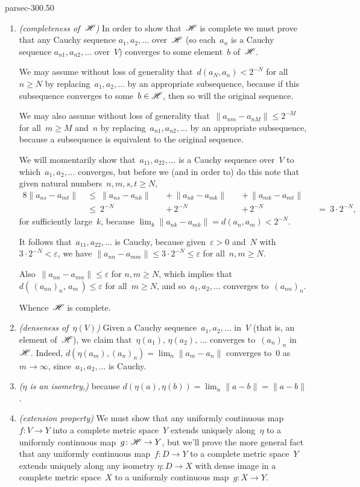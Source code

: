 \documentclass[b5page]{book}
\begin{document}
\begin{solution}{parsec-300.50}
\begin{enumerate}
\item \emph{(completeness of~$\mathscr{H}$)}
In order to show that~$\mathscr{H}$
is complete
we must prove that any
Cauchy sequence
$a_1,a_2,\dotsc$ over~$\mathscr{H}$
(so each~$a_n$ is a Cauchy sequence $a_{n1},a_{n2},\dotsc$
over~$V$) converges to some element~$b$ of~$\mathscr{H}$.

We may assume without loss of generality
that~$d(a_N,a_n)< 2^{-N}$
for all~$n\geq N$
by replacing~$a_1,a_2,\dotsc$
by an appropriate subsequence,
because if this subsequence converges to some~$b\in \mathscr{H}$,
then so will the original sequence.

We may also assume without loss of generality
that~$\|a_{nm}-a_{nM}\| \leq  2^{-M}$
for all~$m\geq M$ and~$n$
by replacing~$a_{n1},a_{n2},\dotsc$
by an appropriate subsequence,
because a subsequence is equivalent
to the original sequence.

We will momentarily show that~$a_{11},a_{22},\dotsc$
is a Cauchy sequence over~$V$
to which~$a_1,a_2,\dotsc$ converges,
but before we (and in order to) do this
note that given natural numbers~$n,m,s,t\geq N$,
\begin{alignat*}{8}
\|a_{ns}-a_{mt}\|\ &\leq\ 
\|a_{ns}-a_{nk}\|
\,&&+\,
\|a_{nk}-a_{mk}\|
\,&&+\,
\|a_{mk}-a_{mt}\|&& \\
\ &\leq\ 
 2^{-N}
&&+\, 2^{-N}
&&+\, 2^{-N}
\ &&=\ 3\cdot 2^{-N},
\end{alignat*}
for sufficiently large~$k$,
because 
$\textstyle{} \lim_k \|a_{nk}-a_{mk}\|
=d(a_n,a_m)
< 2^{-N}$.

It follows that~$a_{11},a_{22},\dotsc$
is Cauchy,
because given~$\varepsilon>0$
and~$N$ with $3\cdot 2^{-N}<\varepsilon$,
we have 
$\|a_{nn}-a_{mm}\|\leq 3\cdot 2^{-N}\leq \varepsilon$
for all~$n,m\geq N$.

Also~$\|a_{nn}-a_{mn}\|\leq \varepsilon$
for $n,m\geq N$,
which implies that $d(\,(a_{nn})_n,\, a_m\,)\leq \varepsilon$
for all~$m\geq N$,
and so~$a_1,a_2,\dotsc$ converges to~$(a_{nn})_n$.

Whence~$\mathscr{H}$ is complete.

\item
\label{S30Vdenseness}
\emph{(denseness of~$\eta(V)$)}
Given a Cauchy sequence~$a_1,a_2,\dotsc$ in~$V$
(that is, an element of~$\mathscr{H}$),
we claim that~$\eta(a_1),\,\eta(a_2),\,\dotsc$
converges to~$(a_n)_n$ in~$\mathscr{H}$.
Indeed, $d(\eta(a_m),(a_n)_n) = \lim_n\|a_m-a_n\|$
converges to~$0$ as~$m\to \infty$,
since~$a_1,a_2,\dotsc$ is Cauchy.

\item
\label{S30Visometry}
\emph{($\eta$ is an isometry,)}
because 
$d(\eta(a),\eta(b))
= \lim_n \|a-b\| = \|a-b\|$.
\item
\label{S30Vextension}
\emph{(extension property)}
We must show that any
uniformly continuous map $f\colon V\to Y$
into a complete metric space~$Y$
extends uniquely along~$\eta$ 
to a uniformly continuous map~$g\colon \mathscr{H}\to Y$,
but we'll prove the more general 
fact that any uniformly continuous map~$f\colon D\to Y$
to a complete metric space~$Y$
extends uniquely along any isometry $\eta\colon D\to X$
with dense image in a complete metric space~$X$
to a uniformly continuous map~$g\colon X\to Y$.


\end{enumerate}
\end{solution}
\end{document}
